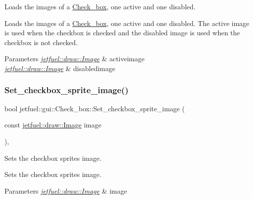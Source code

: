 Loads the images of a \hyperlink{classjetfuel_1_1gui_1_1Check__box}{Check\+\_\+box}, one active and one disabled. 

Loads the images of a \hyperlink{classjetfuel_1_1gui_1_1Check__box}{Check\+\_\+box}, one active and one disabled. The active image is used when the checkbox is checked and the disabled image is used when the checkbox is not checked.


\begin{DoxyParams}{Parameters}
{\em \hyperlink{classjetfuel_1_1draw_1_1Image}{jetfuel\+::draw\+::\+Image}} & activeimage \\
\hline
{\em \hyperlink{classjetfuel_1_1draw_1_1Image}{jetfuel\+::draw\+::\+Image}} & disabledimage \\
\hline
\end{DoxyParams}
\mbox{\label{classjetfuel_1_1gui_1_1Check__box_a276fb1567260c41b07079c600143ce3d}} 
\subsubsection{\texorpdfstring{Set\+\_\+checkbox\+\_\+sprite\+\_\+image()}{Set\_checkbox\_sprite\_image()}}
{\footnotesize\ttfamily bool jetfuel\+::gui\+::\+Check\+\_\+box\+::\+Set\+\_\+checkbox\+\_\+sprite\+\_\+image (\begin{DoxyParamCaption}\item[{const \hyperlink{classjetfuel_1_1draw_1_1Image}{jetfuel\+::draw\+::\+Image}}]{image }\end{DoxyParamCaption})\hspace{0.3cm}{\ttfamily [inline]}, {\ttfamily [protected]}}



Sets the checkbox sprite\textquotesingle{}s image. 

Sets the checkbox sprite\textquotesingle{}s image.


\begin{DoxyParams}{Parameters}
{\em \hyperlink{classjetfuel_1_1draw_1_1Image}{jetfuel\+::draw\+::\+Image}} & image \\
\hline
\end{DoxyParams}
\mbox{\label{classjetfuel_1_1gui_1_1Check__box_ac422c99da29eab41b4849d6d0a55ff70}} 
